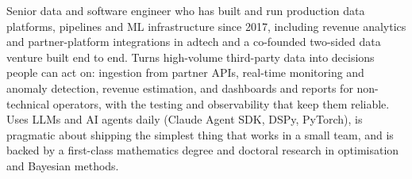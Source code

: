 
\begin{cvparagraph}

Senior data and software engineer who has built and run production data platforms, pipelines and ML infrastructure since 2017, including revenue analytics and partner-platform integrations in adtech and a co-founded two-sided data venture built end to end. Turns high-volume third-party data into decisions people can act on: ingestion from partner APIs, real-time monitoring and anomaly detection, revenue estimation, and dashboards and reports for non-technical operators, with the testing and observability that keep them reliable. Uses LLMs and AI agents daily (Claude Agent SDK, DSPy, PyTorch), is pragmatic about shipping the simplest thing that works in a small team, and is backed by a first-class mathematics degree and doctoral research in optimisation and Bayesian methods.

\end{cvparagraph}
